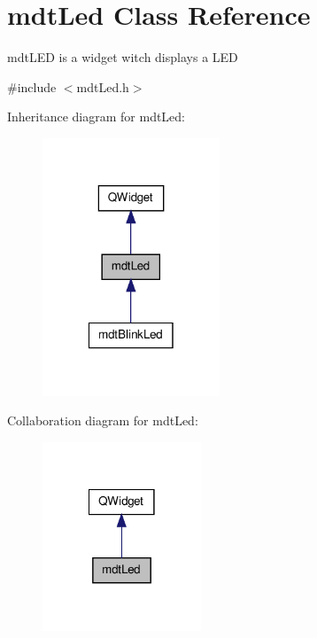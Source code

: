 \hypertarget{classmdt_led}{\section{mdt\-Led Class Reference}
\label{classmdt_led}
}


mdt\-L\-E\-D is a widget witch displays a L\-E\-D  




{\ttfamily \#include $<$mdt\-Led.\-h$>$}



Inheritance diagram for mdt\-Led\-:\nopagebreak
\begin{figure}[H]
\begin{center}
\leavevmode
\includegraphics[width=150pt]{classmdt_led__inherit__graph}
\end{center}
\end{figure}


Collaboration diagram for mdt\-Led\-:\nopagebreak
\begin{figure}[H]
\begin{center}
\leavevmode
\includegraphics[width=134pt]{classmdt_led__coll__graph}
\end{center}
\end{figure}
